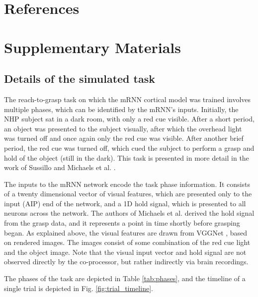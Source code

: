 \documentclass[12pt]{iopart}
\begin{document}
\section*{References}



\newpage

\section{Supplementary Materials}
\subsection{Details of the simulated task}
\label{sup:michaelstask}

The reach-to-grasp task on which the mRNN cortical model was trained involves multiple phases, which can be identified by the
mRNN's inputs. Initially, the NHP subject sat in a dark room, with only a red cue visible. After a short period,
an object was presented to the subject visually, after which the overhead light was turned off and once again
only the red cue was visible. After another brief period, the red cue was turned off, which cued the subject
to perform a grasp and hold of the object (still in the dark). This task is presented in more detail in the
work of Sussillo \cite{sussillo.mrnn} and Michaels et al. \cite{michaels.mrnn}.

The inputs to the mRNN network encode the task phase information. It consists of a twenty dimensional vector
of visual features, which are presented only to the input (AIP) end of the network, and a 1D hold signal,
which is presented to all neurons across the network. The authors of Michaels et al. \cite{michaels.mrnn}
derived the hold signal from the grasp data, and it represents a point in time shortly before grasping began.
As explained above, the visual features are drawn from VGGNet \cite{simonyan.vgg}, based on rendered images.
The images consist of some combination of the red cue light and the object image. Note that the visual input
vector and hold signal are not observed directly by the co-processor, but rather indirectly via brain
recordings.

The phases of the task are depicted in Table \ref{tab:phases}, and the timeline of a single trial is
depicted in Fig. \ref{fig:trial_timeline}.
\end{document}

